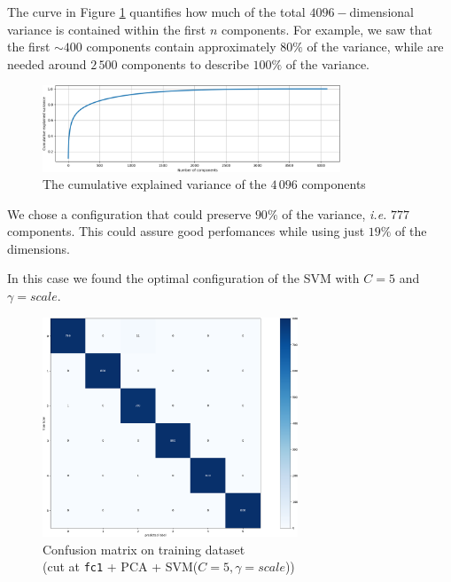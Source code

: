 \documentclass[compsoc]{IEEEtran}
\begin{document}
The curve in Figure \ref{fig:var1} quantifies how much of the total $4096-$dimensional variance is contained within the first $n$ components. For example, we saw that the first ${\sim400}$ components contain approximately $80\%$ of the variance, while are needed around $2\,500$ components to describe $100\%$ of the variance.
\begin{figure}[ht!]
\centering                                                                        
\includegraphics[width=3.5in]{../images/var-1.png}
\captionsetup{justification=centering}                                                                                         
\caption{The cumulative explained variance of the $4\,096$ components}
\label{fig:var1}                                                                                                                               
\end{figure}
We chose a configuration that could preserve $90\%$ of the variance, \emph{i.e.} $777$ components. This could assure good perfomances while using just $19\%$ of the dimensions.\par
In this case we found the optimal configuration of the SVM with $C=5$ and $\gamma=scale$.

\begin{figure}[ht!]
\centering                                                                        
\includegraphics[width=3in]{../images/cm1-pca-train.png}
\captionsetup{justification=centering}                                                                                         
\caption{Confusion matrix on training dataset \\ (cut at \texttt{fc1} + PCA + SVM($C=5, \gamma=scale$))}
\label{fig:cm1-pca-train}                                                                                                                               
\end{figure}
\end{document}
